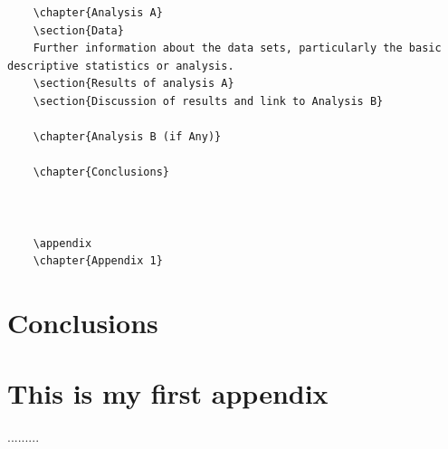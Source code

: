 \documentclass[12pt,MSc,a4paper,oneside]{muthesis}
\begin{document}
\begin{verbatim}
    \chapter{Analysis A}
    \section{Data}
    Further information about the data sets, particularly the basic descriptive statistics or analysis.
    \section{Results of analysis A}
    \section{Discussion of results and link to Analysis B}
    
    \chapter{Analysis B (if Any)}
    
    \chapter{Conclusions}
    
    

    \appendix
    \chapter{Appendix 1}

\end{verbatim}



\chapter{Conclusions}

\providecommand{\harvardpreambledefs}[1]{#1}
\providecommand{\harvardpreambletext}[1]{}
\cleardoublepage
{}


\appendix
\chapter{This is my first appendix}
.........

\end{document}
